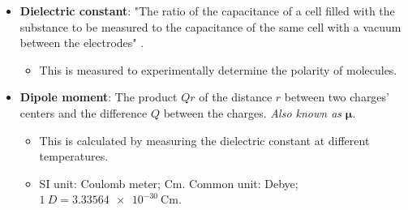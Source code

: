 \documentclass[../notes.tex]{subfiles}
\begin{document}
\begin{itemize}
    \item \textbf{Dielectric constant}: "The ratio of the capacitance of a cell filled with the substance to be measured to the capacitance of the same cell with a vacuum between the electrodes" \parencite[66]{bib:MiesslerFischerTarr}.
    \begin{itemize}
        \item This is measured to experimentally determine the polarity of molecules.
    \end{itemize}
    \item \textbf{Dipole moment}: The product $Qr$ of the distance $r$ between two charges' centers and the difference $Q$ between the charges. \emph{Also known as} $\bm{\mu}$.
    \begin{itemize}
        \item This is calculated by measuring the dielectric constant at different temperatures.
        \item SI unit: Coulomb meter; $\si{\coulomb\meter}$. Common unit: Debye; $\SI{1}{D}=\SI{3.33564e-30}{\coulomb\meter}$.
    \end{itemize}
\end{itemize}
\end{document}
